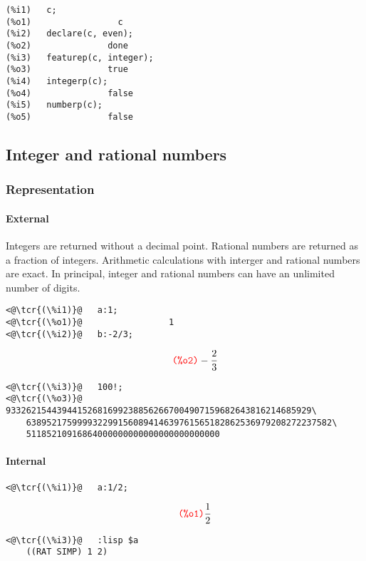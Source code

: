 \documentclass[../Maxima_Workbook.tex]{subfiles}
\begin{document}
\begin{lstlisting}
(%i1)	c;
(%o1)				  c
(%i2) 	declare(c, even);
(%o2)				done
(%i3) 	featurep(c, integer);
(%o3)				true
(%i4) 	integerp(c);
(%o4)				false
(%i5) 	numberp(c);
(%o5)				false
\end{lstlisting}

\subsection{Integer and rational numbers}

\subsubsection{Representation}

\paragraph{External} \mbox{}

\lz Integers are returned without a decimal point. Rational numbers are returned as a fraction of integers. Arithmetic calculations with interger and rational numbers are exact. In principal, integer and rational numbers can have an unlimited number of digits.

\lz \begin{small}
\color{blue} \leqn
\begin{lstlisting}
<@\tcr{(\%i1)}@   a:1;
<@\tcr{(\%o1)}@			        1
<@\tcr{(\%i2)}@   b:-2/3;	
\end{lstlisting}
\vspace{-4mm} \[\tag*{\tcr{\ttfamily (\%o2)}} -\frac{2}{3} \]
\vspace{-6mm} \begin{lstlisting}
<@\tcr{(\%i3)}@   100!;
<@\tcr{(\%o3)}@   933262154439441526816992388562667004907159682643816214685929\
	638952175999932299156089414639761565182862536979208272237582\
	51185210916864000000000000000000000000
\end{lstlisting}
\color{blue} \leqn
\lz \end{small}

\vspace{-2mm} \paragraph{Internal} \mbox{}

\lz \begin{small}
	\color{blue} \leqn
\begin{lstlisting}
<@\tcr{(\%i1)}@   a:1/2;
\end{lstlisting}
\vspace{-4mm} \[\tag*{\tcr{\ttfamily (\%o1)}}
 \frac{1}{2} \]
\vspace{-6mm} \begin{lstlisting}
<@\tcr{(\%i3)}@   :lisp $a
	((RAT SIMP) 1 2) 
\end{lstlisting}
\color{blue} \leqn
\lz \end{small}
\end{document}

